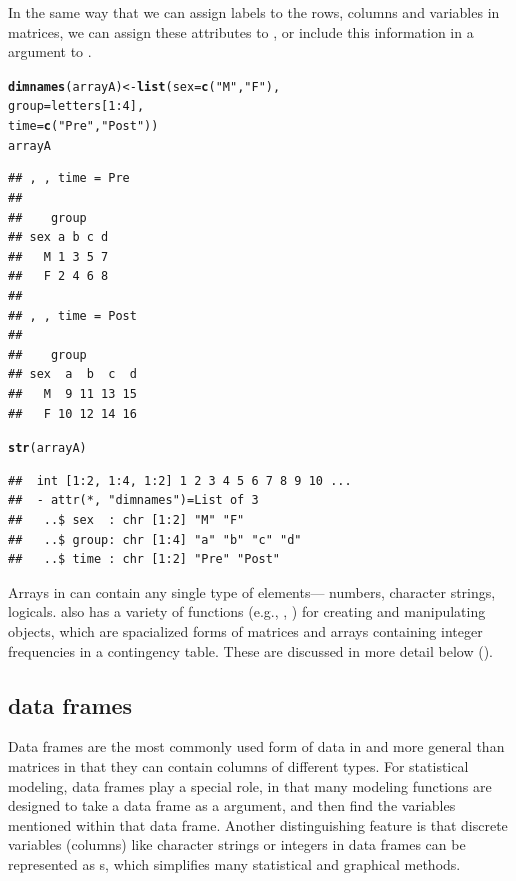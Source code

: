 \documentclass[11pt]{book}\usepackage[]{graphicx}\usepackage[]{color}
\makeatletter
\newcommand{\hlnum}[1]{\textcolor[rgb]{0.686,0.059,0.569}{#1}}%
\newcommand{\hlstr}[1]{\textcolor[rgb]{0.192,0.494,0.8}{#1}}%
\newcommand{\hlopt}[1]{\textcolor[rgb]{0,0,0}{#1}}%
\newcommand{\hlstd}[1]{\textcolor[rgb]{0.345,0.345,0.345}{#1}}%
\newcommand{\hlkwb}[1]{\textcolor[rgb]{0.69,0.353,0.396}{#1}}%
\newcommand{\hlkwc}[1]{\textcolor[rgb]{0.333,0.667,0.333}{#1}}%
\newcommand{\hlkwd}[1]{\textcolor[rgb]{0.737,0.353,0.396}{\textbf{#1}}}%
\newenvironment{kframe}{%
 \def\at@end@of@kframe{}%
 \ifinner\ifhmode%
  \def\at@end@of@kframe{\end{minipage}}%
  \begin{minipage}{\columnwidth}%
 \fi\fi%
 \def\FrameCommand##1{\hskip\@totalleftmargin \hskip-\fboxsep
 \colorbox{shadecolor}{##1}\hskip-\fboxsep
     \hskip-\linewidth \hskip-\@totalleftmargin \hskip\columnwidth}%
 \MakeFramed {\advance\hsize-\width
   \@totalleftmargin\z@ \linewidth\hsize
   \@setminipage}}%
 {\par\unskip\endMakeFramed%
 \at@end@of@kframe}
\newenvironment{knitrout}{}{} %
\renewenvironment{knitrout}{\small\renewcommand{\baselinestretch}{.85}}{} %
\makeatother
\begin{document}
In the same way that we can assign labels to the rows, columns and variables
in matrices, we can assign these attributes to , or
include this information in a  argument to .

\begin{knitrout}
\color{fgcolor}\begin{kframe}
\begin{alltt}
\hlkwd{dimnames}\hlstd{(arrayA)} \hlkwb{<-} \hlkwd{list}\hlstd{(}\hlkwc{sex}\hlstd{=}\hlkwd{c}\hlstd{(}\hlstr{"M"}\hlstd{,} \hlstr{"F"}\hlstd{),}
                         \hlkwc{group}\hlstd{=letters[}\hlnum{1}\hlopt{:}\hlnum{4}\hlstd{],}
                         \hlkwc{time}\hlstd{=}\hlkwd{c}\hlstd{(}\hlstr{"Pre"}\hlstd{,} \hlstr{"Post"}\hlstd{))}
\hlstd{arrayA}
\end{alltt}
\begin{verbatim}
## , , time = Pre
## 
##    group
## sex a b c d
##   M 1 3 5 7
##   F 2 4 6 8
## 
## , , time = Post
## 
##    group
## sex  a  b  c  d
##   M  9 11 13 15
##   F 10 12 14 16
\end{verbatim}
\begin{alltt}
\hlkwd{str}\hlstd{(arrayA)}
\end{alltt}
\begin{verbatim}
##  int [1:2, 1:4, 1:2] 1 2 3 4 5 6 7 8 9 10 ...
##  - attr(*, "dimnames")=List of 3
##   ..$ sex  : chr [1:2] "M" "F"
##   ..$ group: chr [1:4] "a" "b" "c" "d"
##   ..$ time : chr [1:2] "Pre" "Post"
\end{verbatim}
\end{kframe}
\end{knitrout}

Arrays in \R can contain any single type of elements--- numbers,
character strings, logicals.  \R also has a variety of functions
(e.g., , )
for creating and manipulating  objects, which are 
spacialized forms of matrices and arrays containing integer
frequencies in a contingency table. These are discussed in more
detail below ().

\subsection{data frames}\label{sec:data-frames}
Data frames are the most commonly used form of data in \R and more
general than matrices in that they can contain columns of different types.
For statistical modeling, data frames play a special role, in that
many modeling functions are designed to take a data frame as a
 argument, and then find the variables mentioned within
that data frame. Another distinguishing feature is that discrete variables
(columns) like character strings  or integers 
in data frames can be represented as s, which simplifies
many statistical and graphical methods.
\end{document}
